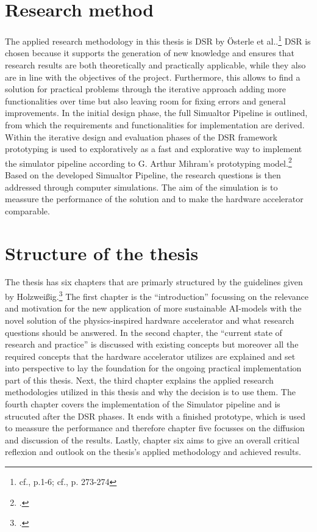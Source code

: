 \section{Research method}

The applied research methodology in this thesis is \ac{DSR} by Österle et al..\footnote{cf.\cite{oesterleMemorandumZurGestaltungsorientierten2010}, p.1-6; cf.\cite{oesterleKonsortialforschung2010}, p. 273-274}
\ac{DSR} is chosen because it supports the generation of new knowledge and ensures that research results are both theoretically and practically
applicable, while they also are in line with the objectives of the project.
Furthermore, this allows to find a solution for practical problems through the iterative approach adding more functionalities over time but also leaving room for fixing errors and general improvements.
In the initial design phase, the full Simualtor Pipeline is outlined, from which the requirements and functionalities for implementation are derived.
Within the iterative design and evaluation phases of the \ac{DSR} framework prototyping is used to exploratively as a fast and explorative way to implement the simulator pipeline according to G. Arthur Mihram's prototyping model.\footcite[cf.][71-72]{mihramSimulationMethodology1976}
Based on the developed Simualtor Pipeline, the research questions is then addressed through computer simulations.
The aim of the simulation is to meassure the performance of the solution and to make the hardware accelerator comparable. 

\section{Structure of the thesis}
The thesis has six chapters that are primarly structured by the guidelines given by Holzweißig.\footcite[cf.][32-40]{holzweissigWissenschaftlichesArbeiten2017}
The first chapter is the ``introduction'' focussing on the relevance and motivation for the new application of more sustainable AI-models
with the novel solution of the physics-inspired hardware accelerator and what research questions should be answered.
In the second chapter, the ``current state of research and practice'' is discussed with 
existing concepts but moreover all the required concepts that the hardware accelerator utilizes are explained 
and set into perspective to lay the foundation for the ongoing practical implementation part of this thesis.
Next, the third chapter explains the applied research methodologies utilized in this thesis and why the decision is to use them.
The fourth chapter covers the implementation of the Simulator pipeline and is strucuted after the \ac{DSR} phases.
It ends with a finished prototype, which is used to meassure the performance and therefore chapter five focusses on the 
diffusion and discussion of the results. 
Lastly, chapter six aims to give an overall critical reflexion and outlook on the thesis's applied methodology and achieved results.









